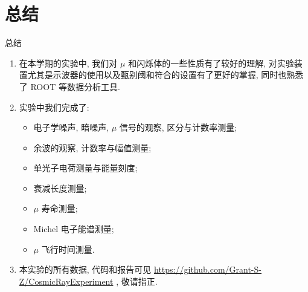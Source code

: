 \documentclass[10pt]{beamer}
\begin{document}
\section{总结}
\label{sec:orgd387d5d}
\begin{frame}[label={sec:org1d3c423}]{总结}
\begin{enumerate}
\item 在本学期的实验中, 我们对 \(\mu\) 和闪烁体的一些性质有了较好的理解, 对实验装置尤其是示波器的使用以及甄别阈和符合的设置有了更好的掌握, 同时也熟悉了 ROOT 等数据分析工具.
\item 实验中我们完成了:
\begin{itemize}
\item 电子学噪声, 暗噪声, \(\mu\) 信号的观察, 区分与计数率测量;
\item 余波的观察, 计数率与幅值测量;
\item 单光子电荷测量与能量刻度;
\item 衰减长度测量;
\item \(\mu\) 寿命测量;
\item Michel 电子能谱测量;
\item \(\mu\) 飞行时间测量.
\end{itemize}
\item 本实验的所有数据, 代码和报告可见 \url{https://github.com/Grant-S-Z/CosmicRayExperiment} , 敬请指正.
\end{enumerate}
\end{frame}
\end{document}
